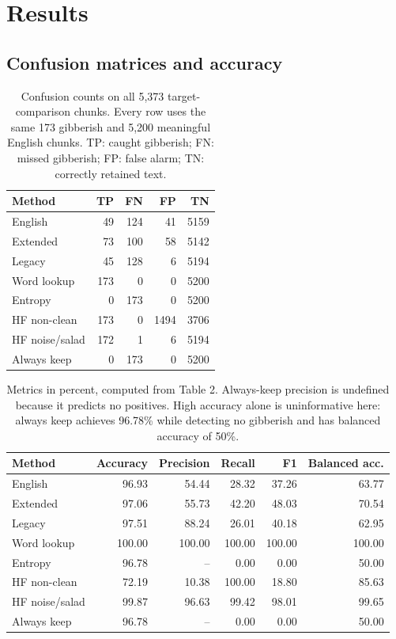 \documentclass[10pt,a4paper,twocolumn]{article}
\begin{document}
\section{Results}\label{results}

\subsection{Confusion matrices and
accuracy}\label{confusion-matrices-and-accuracy}

\begin{table}[htbp]
\centering
\small
\caption{Confusion counts on all 5,373 target-comparison chunks. Every row uses
the same 173 gibberish and 5,200 meaningful English chunks. TP: caught
gibberish; FN: missed gibberish; FP: false alarm; TN: correctly retained
text.}
\begin{tabular}{@{}lrrrr@{}}
\toprule
Method & TP & FN & FP & TN \\
\midrule
English & 49 & 124 & 41 & 5159 \\
Extended & 73 & 100 & 58 & 5142 \\
Legacy & 45 & 128 & 6 & 5194 \\
Word lookup & 173 & 0 & 0 & 5200 \\
Entropy & 0 & 173 & 0 & 5200 \\
HF non-clean & 173 & 0 & 1494 & 3706 \\
HF noise/salad & 172 & 1 & 6 & 5194 \\
Always keep & 0 & 173 & 0 & 5200 \\
\bottomrule
\end{tabular}
\end{table}

\begin{table}[htbp]
\centering
\small
\caption{Metrics in percent, computed from Table 2. Always-keep precision is
undefined because it predicts no positives. High accuracy alone is
uninformative here: always keep achieves 96.78\% while detecting no
gibberish and has balanced accuracy of 50\%.}
\begin{tabular}{@{}lrrrrr@{}}
\toprule
Method & Accuracy & Precision & Recall & F1 & Balanced acc. \\
\midrule
English & 96.93 & 54.44 & 28.32 & 37.26 & 63.77 \\
Extended & 97.06 & 55.73 & 42.20 & 48.03 & 70.54 \\
Legacy & 97.51 & 88.24 & 26.01 & 40.18 & 62.95 \\
Word lookup & 100.00 & 100.00 & 100.00 & 100.00 & 100.00 \\
Entropy & 96.78 & -- & 0.00 & 0.00 & 50.00 \\
HF non-clean & 72.19 & 10.38 & 100.00 & 18.80 & 85.63 \\
HF noise/salad & 99.87 & 96.63 & 99.42 & 98.01 & 99.65 \\
Always keep & 96.78 & -- & 0.00 & 0.00 & 50.00 \\
\bottomrule
\end{tabular}
\end{table}
\end{document}
